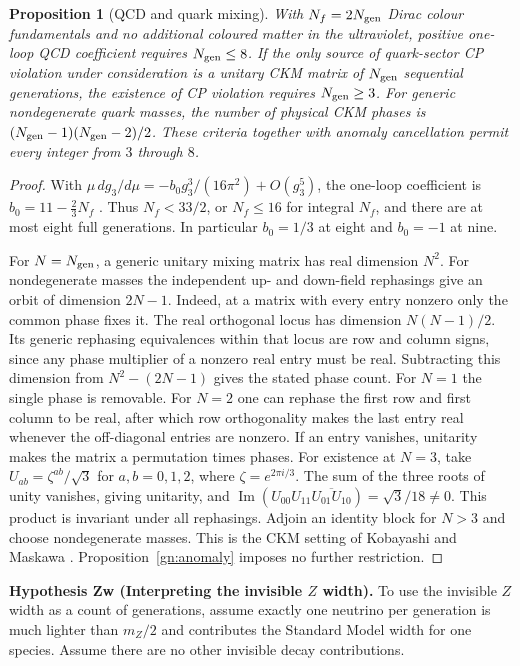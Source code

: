 \documentclass[aps,pra,onecolumn,superscriptaddress,nofootinbib,10pt]{revtex4-2}
\newtheorem{proposition}[theorem]{Proposition}
\theoremstyle{definition}
\theoremstyle{remark}
\begin{document}
\begin{proposition}[QCD and quark mixing]\label{gn:bounds}
With $N_f=2N_{\rm gen}$ Dirac colour fundamentals and no additional
coloured matter in the ultraviolet, positive one-loop QCD coefficient
requires $N_{\rm gen}\leq8$. If the only source of quark-sector CP
violation under consideration is a unitary CKM matrix of
$N_{\rm gen}$ sequential generations, the existence of CP violation
requires $N_{\rm gen}\geq3$. For generic nondegenerate quark masses,
the number of physical CKM phases is
$(N_{\rm gen}-1)(N_{\rm gen}-2)/2$.
These criteria together with anomaly cancellation permit every
integer from $3$ through $8$.
\end{proposition}
\begin{proof}
With $\mu\,dg_3/d\mu=-b_0g_3^3/(16\pi^2)+O(g_3^5)$, the one-loop
coefficient is $b_0=11-\frac23N_f$ \cite{gn:gw,gn:politzer}.
Thus $N_f<33/2$, or $N_f\le16$ for integral $N_f$, and there are
at most eight full generations. In particular $b_0=1/3$ at eight
and $b_0=-1$ at nine.

For $N=N_{\rm gen}$, a generic unitary mixing matrix has real
dimension $N^2$. For nondegenerate masses the independent up- and
down-field rephasings give an orbit of dimension $2N-1$.
Indeed, at a matrix with every entry nonzero only the common
phase fixes it. The real orthogonal locus has dimension
$N(N-1)/2$. Its generic rephasing equivalences within that
locus are row and column signs, since any phase multiplier of a
nonzero real entry must be real. Subtracting this dimension from
$N^2-(2N-1)$ gives the stated phase count. For $N=1$ the single phase
is removable. For $N=2$ one can rephase the first row and first
column to be real, after which row orthogonality makes the last
entry real whenever the off-diagonal entries are nonzero. If
an entry vanishes, unitarity makes the matrix a permutation
times phases. For existence at $N=3$, take
$U_{ab}=\zeta^{ab}/\sqrt3$ for $a,b=0,1,2$,
where $\zeta=e^{2\pi i/3}$. The sum of the three roots of unity
vanishes, giving unitarity, and
$\operatorname{Im}(U_{00}U_{11}\overline{U_{01}U_{10}})
=\sqrt3/18\ne0$. This product is invariant under all rephasings.
Adjoin an identity block for $N>3$ and choose nondegenerate masses.
This is the CKM setting of Kobayashi and Maskawa \cite{gn:km}.
Proposition~\ref{gn:anomaly} imposes no further restriction.
\end{proof}

\smallskip\noindent\textbf{Hypothesis Zw (Interpreting the invisible $Z$ width).}  To use the invisible $Z$ width as a count of generations, assume
exactly one neutrino per generation is much lighter than $m_Z/2$
and contributes the Standard Model width for one species. Assume
there are no other invisible decay contributions.
\end{document}
